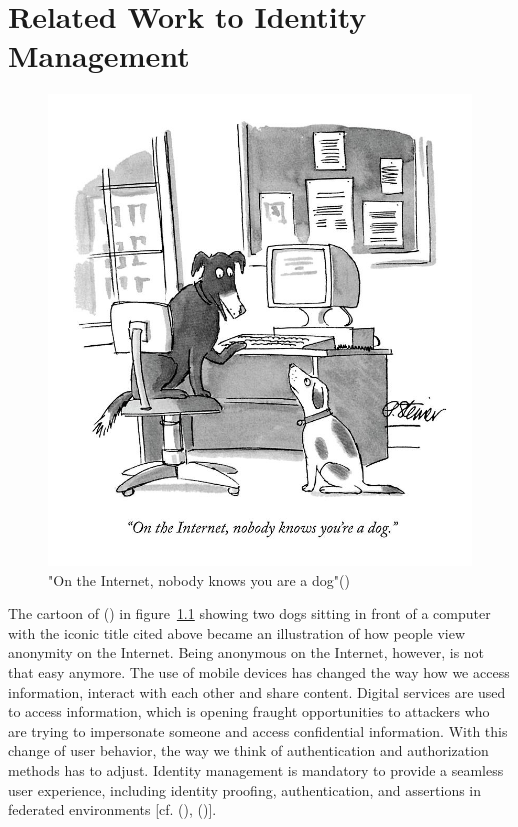 \chapter{Related Work to Identity Management}\label{chap:authenticationandauthorization}

\chapterstart



\begin{figure}[h]
	\centering
	\includegraphics[width=0.6\linewidth]{images/on-the-internet-peter-steine}
	\caption{"On the Internet, nobody knows you are a dog"(\cite{Steiner:Dog:1992})}
	\label{fig:on-the-internet-peter-steine}
\end{figure}

The cartoon of (\cite{Steiner:Dog:1992}) in figure~\ref{fig:on-the-internet-peter-steine} showing two dogs sitting in front of a computer with the iconic title cited above became an illustration of how people view anonymity on the Internet. Being anonymous on the Internet, however, is not that easy anymore. The use of mobile devices has changed the way how we access information, interact with each other and share content. Digital services are used to access information, which is opening fraught opportunities to attackers who are trying to impersonate someone and access confidential information.  With this change of user behavior, the way we think of authentication and authorization methods has to adjust. Identity management is mandatory to provide a seamless user experience, including identity proofing, authentication, and assertions in federated environments [cf. (\cite{NIST:2017:DIG}), (\cite{Corre:2017:WHI})].


